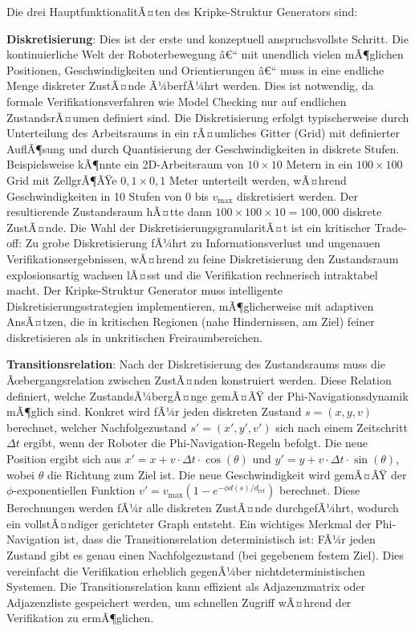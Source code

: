 ﻿\documentclass[a4paper,12pt]{article}
\theoremstyle{definition}
\begin{document}
Die drei HauptfunktionalitÃ¤ten des Kripke-Struktur Generators sind:

\textbf{Diskretisierung}: Dies ist der erste und konzeptuell anspruchsvollste Schritt. Die kontinuierliche Welt der Roboterbewegung â€“ mit unendlich vielen mÃ¶glichen Positionen, Geschwindigkeiten und Orientierungen â€“ muss in eine endliche Menge diskreter ZustÃ¤nde Ã¼berfÃ¼hrt werden. Dies ist notwendig, da formale Verifikationsverfahren wie Model Checking nur auf endlichen ZustandsrÃ¤umen definiert sind. Die Diskretisierung erfolgt typischerweise durch Unterteilung des Arbeitsraums in ein rÃ¤umliches Gitter (Grid) mit definierter AuflÃ¶sung und durch Quantisierung der Geschwindigkeiten in diskrete Stufen. Beispielsweise kÃ¶nnte ein 2D-Arbeitsraum von $10 \times 10$ Metern in ein $100 \times 100$ Grid mit ZellgrÃ¶ÃŸe $0{,}1 \times 0{,}1$ Meter unterteilt werden, wÃ¤hrend Geschwindigkeiten in 10 Stufen von 0 bis $v_{\max}$ diskretisiert werden. Der resultierende Zustandsraum hÃ¤tte dann $100 \times 100 \times 10 = 100{,}000$ diskrete ZustÃ¤nde. Die Wahl der DiskretisierungsgranularitÃ¤t ist ein kritischer Trade-off: Zu grobe Diskretisierung fÃ¼hrt zu Informationsverlust und ungenauen Verifikationsergebnissen, wÃ¤hrend zu feine Diskretisierung den Zustandsraum explosionsartig wachsen lÃ¤sst und die Verifikation rechnerisch intraktabel macht. Der Kripke-Struktur Generator muss intelligente Diskretisierungsstrategien implementieren, mÃ¶glicherweise mit adaptiven AnsÃ¤tzen, die in kritischen Regionen (nahe Hindernissen, am Ziel) feiner diskretisieren als in unkritischen Freiraumbereichen.

\textbf{Transitionsrelation}: Nach der Diskretisierung des Zustandsraums muss die Ãœber\-gangs\-relation zwischen ZustÃ¤nden konstruiert werden. Diese Relation definiert, welche ZustandsÃ¼bergÃ¤nge gemÃ¤ÃŸ der Phi-Navigationsdynamik mÃ¶glich sind. Konkret wird fÃ¼r jeden diskreten Zustand $s = (x, y, v)$ berechnet, welcher Nachfolgezustand $s' = (x', y', v')$ sich nach einem Zeitschritt $\Delta t$ ergibt, wenn der Roboter die Phi-Navigation-Regeln befolgt. Die neue Position ergibt sich aus $x' = x + v \cdot \Delta t \cdot \cos(\theta)$ und $y' = y + v \cdot \Delta t \cdot \sin(\theta)$, wobei $\theta$ die Richtung zum Ziel ist. Die neue Geschwindigkeit wird gemÃ¤ÃŸ der $\phi$-exponentiellen Funktion $v' = v_{\max}(1 - e^{-\phi d(s)/d_{\text{ref}}})$ berechnet. Diese Berechnungen werden fÃ¼r alle diskreten ZustÃ¤nde durchgefÃ¼hrt, wodurch ein vollstÃ¤ndiger gerichteter Graph entsteht. Ein wichtiges Merkmal der Phi-Navigation ist, dass die Transitionsrelation deterministisch ist: FÃ¼r jeden Zustand gibt es genau einen Nachfolgezustand (bei gegebenem festem Ziel). Dies vereinfacht die Verifikation erheblich gegenÃ¼ber nichtdeterministischen Systemen. Die Transitionsrelation kann effizient als Adjazenzmatrix oder Adjazenzliste gespeichert werden, um schnellen Zugriff wÃ¤hrend der Verifikation zu ermÃ¶glichen.
\end{document}
